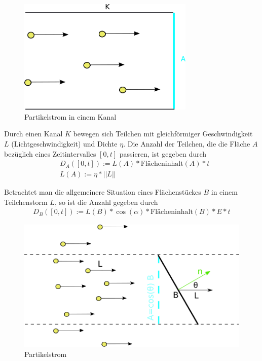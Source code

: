  \begin{figure}[H]
    \centering
    \includegraphics[width=0.75\textwidth]{images/Partikelstrom.png}
    \caption{Partikelstrom in einem Kanal}
    \label{fig:cray}
\end{figure}
Durch einen Kanal $K$ bewegen  sich Teilchen mit gleichförmiger Geschwindigkeit $L$ (Lichtgeschwindigkeit)  und  Dichte $\eta$.
Die Anzahl der Teilchen, die die Fläche $A$ bezüglich eines Zeitintervalles $[0,t]$ passieren, ist gegeben durch
\begin{align}
& D_A([0,t]) :=L(A) *  \text{Flächeninhalt}(A) *   t \\
& L(A):= \eta * ||L||  
\end{align}

 Betrachtet man die allgemeinere Situation eines Flächenstückes $B$  in einem Teilchenstorm $L$, so ist die Anzahl gegeben durch 
\begin{align}
D_B([0,t]) :=L(B) * \cos(\alpha) *  \text{Flächeninhalt} (B) *   E * t
 \end{align}
\begin{figure}[H]
    \centering
    \includegraphics[width=1.0\textwidth]{images/Strahldichte.png}
    \caption{Partikelstrom}
    \label{fig:cray}
\end{figure}

